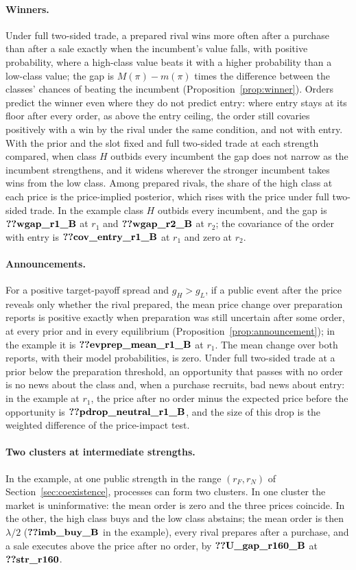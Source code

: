 \paragraph{Winners.} Under full two-sided trade, a prepared rival wins more often after a purchase than after a
sale exactly when the incumbent's value falls, with positive probability, where a high-class value beats it with a
higher probability than a low-class value; the gap is \(M(\pi)-m(\pi)\) times the difference between the classes' chances of
beating the incumbent (Proposition~\ref{prop:winner}). Orders predict the winner even where they do not predict
entry: where entry stays at its floor after every order, as above the entry ceiling, the order still covaries
positively with a win by the rival under the same condition, and not with entry. With the prior and the slot fixed and
full two-sided trade at each strength compared, when class \(H\) outbids every incumbent the gap does not narrow as
the incumbent strengthens, and it widens wherever the stronger incumbent takes wins from the low class. Among
prepared rivals, the share of the high class at each price is the price-implied posterior, which rises with the
price under full two-sided trade. In the example class \(H\) outbids every incumbent, and the gap is
\(\reg{wgap_r1_B}\) at \(r_1\) and \(\reg{wgap_r2_B}\) at \(r_2\); the covariance of the order with entry is
\(\reg{cov_entry_r1_B}\) at \(r_1\) and zero at \(r_2\).

\paragraph{Announcements.} For a positive target-payoff spread and \(g_H>g_L\), if a public event after the price reveals only whether the
rival prepared, the mean price change over preparation reports is positive exactly when preparation was still uncertain after some order, at
every prior and in every equilibrium (Proposition~\ref{prop:announcement}); in the example it is
\(\reg{evprep_mean_r1_B}\) at \(r_1\). The mean change over both reports, with their model probabilities, is zero. Under
full two-sided trade at a prior below the preparation threshold, an opportunity that passes with no order is no news
about the class and, when a purchase recruits, bad news about entry: in the example at \(r_1\), the price after no
order minus the expected price before the opportunity is \(\reg{pdrop_neutral_r1_B}\), and the size of this drop is
the weighted difference of the price-impact test.

\paragraph{Two clusters at intermediate strengths.} In the example, at one public strength in the range
\((r_F,r_N)\) of Section~\ref{sec:coexistence}, processes can form two clusters. In one cluster the market is uninformative:
the mean order is zero and the three prices coincide. In the other, the high class buys and the low class abstains;
the mean order is then \(\lambda/2\) (\(\reg{imb_buy_B}\) in the example), every rival prepares after a purchase,
and a sale executes above the price after no order, by \(\reg{U_gap_r160_B}\) at \(\reg{str_r160}\).

